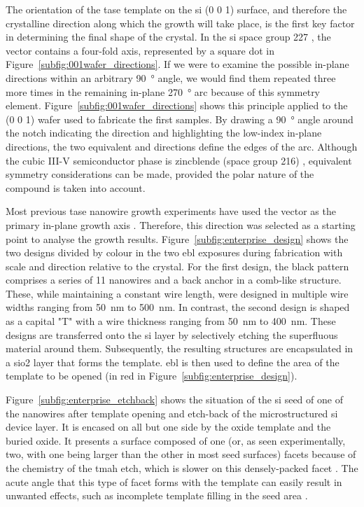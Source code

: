 The orientation of the \acs{tase} template on the \acs{si} \hkl(0 0 1) surface, and therefore the crystalline direction along which the growth will take place, is the first key factor in determining the final shape of the crystal. In the \acs{si} space group \num{227} \cite{osti_si}, the  vector contains a four-fold axis, represented by a square dot in Figure~\ref{subfig:001wafer_directions}. If we were to examine the possible in-plane directions within an arbitrary \qty{90}{\degree} angle, we would find them repeated three more times in the remaining in-plane \qty{270}{\degree} arc because of this symmetry element. Figure~\ref{subfig:001wafer_directions} shows this principle applied to the \hkl(0 0 1) wafer used to fabricate the first samples. By drawing a \qty{90}{\degree} angle around the notch indicating the \hkl[1 1 0] direction and highlighting the low-index in-plane directions, the two equivalent \hkl[0 1 0] and \hkl[1 0 0] directions define the edges of the arc. Although the cubic III-V semiconductor phase is zincblende (space group \num{216}) \cite{wyckoff1963crystal, osti_gaas_zb, osti_inas_zb, osti_inp_zb}, equivalent symmetry considerations can be made, provided the polar nature of the compound is taken into account.
\par
Most previous \acs{tase} nanowire growth experiments have used the  vector as the primary in-plane growth axis \cite{Brunelli2019, Knoedler2017, Borg2017}. Therefore, this direction was selected as a starting point to analyse the growth results. Figure~\ref{subfig:enterprise_design} shows the two designs divided by colour in the two \acf{ebl} exposures during fabrication with scale and direction relative to the crystal. For the first design, the black pattern comprises a series of \num{11} nanowires and a back anchor in a comb-like structure. These, while maintaining a constant wire length, were designed in multiple wire widths ranging from \qty{50}{\nano\metre} to \qty{500}{\nano\metre}. In contrast, the second design is shaped as a capital "T" with a wire thickness ranging from \qty{50}{\nano\metre} to \qty{400}{\nano\metre}. These designs are transferred onto the \acs{si} layer by selectively etching the superfluous material around them. Subsequently, the resulting structures are encapsulated in a \acs{sio2} layer that forms the template. \acs{ebl} is then used to define the area of the template to be opened (in red in Figure~\ref{subfig:enterprise_design}).
\par
Figure~\ref{subfig:enterprise_etchback} shows the situation of the \acs{si} seed of one of the nanowires after template opening and etch-back of the microstructured \acs{si} device layer. It is encased on all but one side by the oxide template and the buried oxide. It presents a surface composed of one (or, as seen experimentally, two, with one being larger than the other in most seed surfaces)  facets because of the chemistry of the \acs{tmah} etch, which is slower on this densely-packed facet \cite{Zubel2012}. The acute angle that this type of facet forms with the template can easily result in unwanted effects, such as incomplete template filling in the seed area \cite{Scherrer2022}. 

